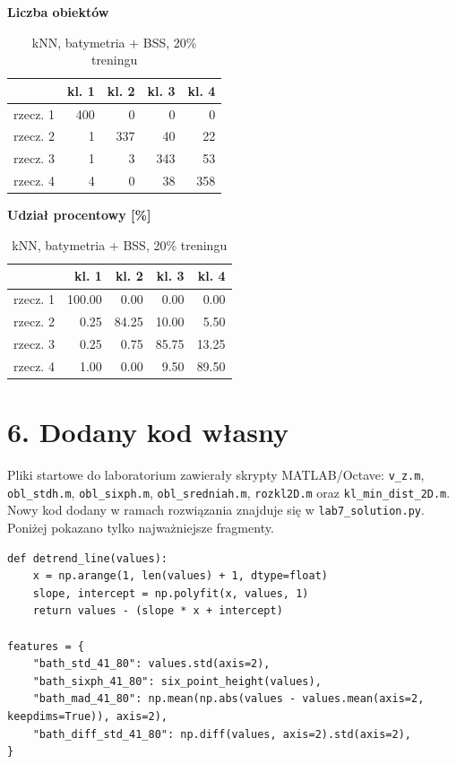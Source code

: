 \documentclass[11pt,a4paper]{article}
\begin{document}
\begin{table}[H]
\centering
\small
\caption{kNN, batymetria + BSS, 20\% treningu}
\begin{minipage}{0.47\textwidth}
\centering
\textbf{Liczba obiektów}\\[0.35em]
\begin{tabular}{lrrrr}
\toprule
 & kl. 1 & kl. 2 & kl. 3 & kl. 4 \\
\midrule
rzecz. 1 & 400 & 0 & 0 & 0 \\
rzecz. 2 & 1 & 337 & 40 & 22 \\
rzecz. 3 & 1 & 3 & 343 & 53 \\
rzecz. 4 & 4 & 0 & 38 & 358 \\
\bottomrule
\end{tabular}
\end{minipage}\hfill
\begin{minipage}{0.47\textwidth}
\centering
\textbf{Udział procentowy [\%]}\\[0.35em]
\begin{tabular}{lrrrr}
\toprule
 & kl. 1 & kl. 2 & kl. 3 & kl. 4 \\
\midrule
rzecz. 1 & 100.00 & 0.00 & 0.00 & 0.00 \\
rzecz. 2 & 0.25 & 84.25 & 10.00 & 5.50 \\
rzecz. 3 & 0.25 & 0.75 & 85.75 & 13.25 \\
rzecz. 4 & 1.00 & 0.00 & 9.50 & 89.50 \\
\bottomrule
\end{tabular}
\end{minipage}
\end{table}


\section*{6. Dodany kod własny}
Pliki startowe do laboratorium zawierały skrypty MATLAB/Octave: \texttt{v\_z.m}, \texttt{obl\_stdh.m}, \texttt{obl\_sixph.m}, \texttt{obl\_sredniah.m}, \texttt{rozkl2D.m} oraz \texttt{kl\_min\_dist\_2D.m}. Nowy kod dodany w ramach rozwiązania znajduje się w \texttt{lab7\_solution.py}. Poniżej pokazano tylko najważniejsze fragmenty.


\begin{lstlisting}[caption={Fragment własnego kodu: detrending i parametry batymetryczne.}]
def detrend_line(values):
    x = np.arange(1, len(values) + 1, dtype=float)
    slope, intercept = np.polyfit(x, values, 1)
    return values - (slope * x + intercept)

features = {
    "bath_std_41_80": values.std(axis=2),
    "bath_sixph_41_80": six_point_height(values),
    "bath_mad_41_80": np.mean(np.abs(values - values.mean(axis=2, keepdims=True)), axis=2),
    "bath_diff_std_41_80": np.diff(values, axis=2).std(axis=2),
}
\end{lstlisting}
\end{document}
